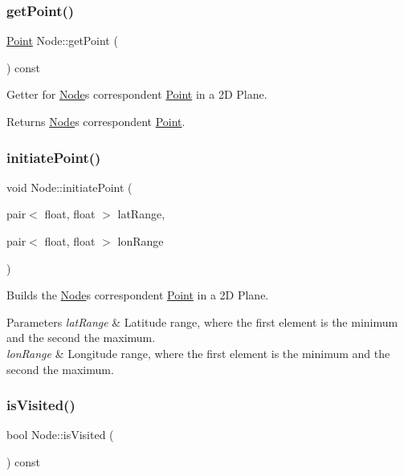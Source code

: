\subsubsection{\texorpdfstring{get\+Point()}{getPoint()}}
{\footnotesize\ttfamily \hyperlink{class_point}{Point} Node\+::get\+Point (\begin{DoxyParamCaption}{ }\end{DoxyParamCaption}) const}

Getter for \hyperlink{class_node}{Node}\textquotesingle{}s correspondent \hyperlink{class_point}{Point} in a 2D Plane.

\begin{DoxyReturn}{Returns}
\hyperlink{class_node}{Node}\textquotesingle{}s correspondent \hyperlink{class_point}{Point}. 
\end{DoxyReturn}
\hypertarget{class_node_a599f948564fa9f0cb358fe030161eb1e}{}\label{class_node_a599f948564fa9f0cb358fe030161eb1e} 
\subsubsection{\texorpdfstring{initiate\+Point()}{initiatePoint()}}
{\footnotesize\ttfamily void Node\+::initiate\+Point (\begin{DoxyParamCaption}\item[{pair$<$ float, float $>$}]{lat\+Range,  }\item[{pair$<$ float, float $>$}]{lon\+Range }\end{DoxyParamCaption})}

Builds the \hyperlink{class_node}{Node}\textquotesingle{}s correspondent \hyperlink{class_point}{Point} in a 2D Plane.


\begin{DoxyParams}{Parameters}
{\em lat\+Range} & Latitude range, where the first element is the minimum and the second the maximum. \\
\hline
{\em lon\+Range} & Longitude range, where the first element is the minimum and the second the maximum. \\
\hline
\end{DoxyParams}
\hypertarget{class_node_a97dd8f95e09a0516f8939627f94bd58e}{}\label{class_node_a97dd8f95e09a0516f8939627f94bd58e} 
\subsubsection{\texorpdfstring{is\+Visited()}{isVisited()}}
{\footnotesize\ttfamily bool Node\+::is\+Visited (\begin{DoxyParamCaption}{ }\end{DoxyParamCaption}) const}

